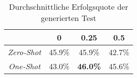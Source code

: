 \bgroup
\def\arraystretch{2}
\begin{table}[H]
	\vspace{.5cm}
	\centering		
	\begin{center}
		\begin{tabular}{|c||c|c|c|}
			\hline 
			& 0 & 0.25 & 0.5 \\
			\hline 
			\hline
			\textit{Zero-Shot} & 45.9\% & 45.9\% & 42.7\% \\
			\hline
			\textit{One-Shot} & 43.0\% & \textbf{46.0\%} & 45.6\% \\
			\hline
		\end{tabular} 
	\end{center}
	\caption{Durchschnittliche Erfolgsquote der generierten Test}
	\label{fig:succ}
	\vspace{-.8cm}
\end{table}
\egroup